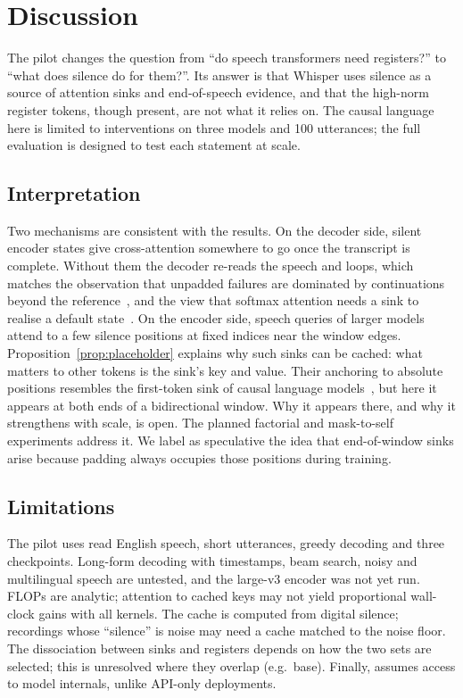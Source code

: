 \section{Discussion}
\label{sec:discussion}

The pilot changes the question from ``do speech transformers need registers?'' to ``what does silence do for them?''. Its answer is that Whisper uses silence as a source of attention sinks and end-of-speech evidence, and that the high-norm register tokens, though present, are not what it relies on. The causal language here is limited to interventions on three models and 100 utterances; the full evaluation is designed to test each statement at scale.

\subsection{Interpretation}

Two mechanisms are consistent with the results. On the decoder side, silent encoder states give cross-attention somewhere to go once the transcript is complete. Without them the decoder re-reads the speech and loops, which matches the observation that unpadded failures are dominated by continuations beyond the reference~\cite{lee2026npusper}, and the view that softmax attention needs a sink to realise a default state~\cite{ranmilo2026necessary}. On the encoder side, speech queries of larger models attend to a few silence positions at fixed indices near the window edges. Proposition~\ref{prop:placeholder} explains why such sinks can be cached: what matters to other tokens is the sink's key and value. Their anchoring to absolute positions resembles the first-token sink of causal language models~\cite{sun2026anatomy,li2026structural}, but here it appears at both ends of a bidirectional window. Why it appears there, and why it strengthens with scale, is open. The planned factorial and mask-to-self experiments address it. We label as speculative the idea that end-of-window sinks arise because padding always occupies those positions during training.

\subsection{Limitations}

The pilot uses read English speech, short utterances, greedy decoding and three checkpoints. Long-form decoding with timestamps, beam search, noisy and multilingual speech are untested, and the large-v3 encoder was not yet run. FLOPs are analytic; attention to cached keys may not yield proportional wall-clock gains with all kernels. The cache is computed from digital silence; recordings whose ``silence'' is noise may need a cache matched to the noise floor. The dissociation between sinks and registers depends on how the two sets are selected; this is unresolved where they overlap (e.g.\ base). Finally, \method{} assumes access to model internals, unlike API-only deployments.

